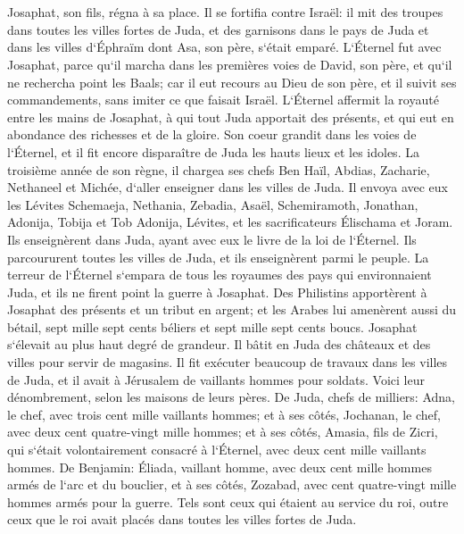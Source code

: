 \chapter{}

\verse Josaphat, son fils, régna à sa place. 
\verse Il se fortifia contre Israël: il mit des troupes dans toutes les villes fortes de Juda, et des garnisons dans le pays de Juda et dans les villes d`Éphraïm dont Asa, son père, s`était emparé. 
\verse L`Éternel fut avec Josaphat, parce qu`il marcha dans les premières voies de David, son père, et qu`il ne rechercha point les Baals; 
\verse car il eut recours au Dieu de son père, et il suivit ses commandements, sans imiter ce que faisait Israël. 
\verse L`Éternel affermit la royauté entre les mains de Josaphat, à qui tout Juda apportait des présents, et qui eut en abondance des richesses et de la gloire. 
\verse Son coeur grandit dans les voies de l`Éternel, et il fit encore disparaître de Juda les hauts lieux et les idoles. 
\verse La troisième année de son règne, il chargea ses chefs Ben Haïl, Abdias, Zacharie, Nethaneel et Michée, d`aller enseigner dans les villes de Juda. 
\verse Il envoya avec eux les Lévites Schemaeja, Nethania, Zebadia, Asaël, Schemiramoth, Jonathan, Adonija, Tobija et Tob Adonija, Lévites, et les sacrificateurs Élischama et Joram. 
\verse Ils enseignèrent dans Juda, ayant avec eux le livre de la loi de l`Éternel. Ils parcoururent toutes les villes de Juda, et ils enseignèrent parmi le peuple. 
\verse La terreur de l`Éternel s`empara de tous les royaumes des pays qui environnaient Juda, et ils ne firent point la guerre à Josaphat. 
\verse Des Philistins apportèrent à Josaphat des présents et un tribut en argent; et les Arabes lui amenèrent aussi du bétail, sept mille sept cents béliers et sept mille sept cents boucs. 
\verse Josaphat s`élevait au plus haut degré de grandeur. Il bâtit en Juda des châteaux et des villes pour servir de magasins. 
\verse Il fit exécuter beaucoup de travaux dans les villes de Juda, et il avait à Jérusalem de vaillants hommes pour soldats. 
\verse Voici leur dénombrement, selon les maisons de leurs pères. De Juda, chefs de milliers: Adna, le chef, avec trois cent mille vaillants hommes; 
\verse et à ses côtés, Jochanan, le chef, avec deux cent quatre-vingt mille hommes; 
\verse et à ses côtés, Amasia, fils de Zicri, qui s`était volontairement consacré à l`Éternel, avec deux cent mille vaillants hommes. 
\verse De Benjamin: Éliada, vaillant homme, avec deux cent mille hommes armés de l`arc et du bouclier, 
\verse et à ses côtés, Zozabad, avec cent quatre-vingt mille hommes armés pour la guerre. 
\verse Tels sont ceux qui étaient au service du roi, outre ceux que le roi avait placés dans toutes les villes fortes de Juda. 

